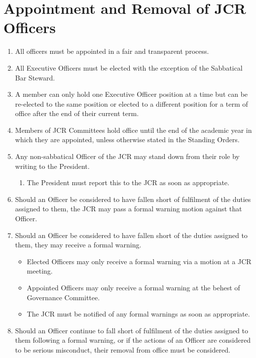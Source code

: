 \documentclass[12pt]{article}
\begin{document}
\section{Appointment and Removal of JCR Officers}
\begin{enumerate}
    \item All officers must be appointed in a fair and transparent process.
    \item All Executive Officers must be elected with the exception of the Sabbatical Bar Steward.
    \item A member can only hold one Executive Officer position at a time but can be re-elected to the same position or elected to a different position for a term of office after the end of their current term.
    \item Members of JCR Committees hold office until the end of the academic year in which they are appointed, unless otherwise stated in the Standing Orders.
    \item Any non-sabbatical Officer of the JCR may stand down from their role by writing to the President.
    \begin{enumerate}
        \item The President must report this to the JCR as soon as appropriate.
    \end{enumerate}
    \item Should an Officer be considered to have fallen short of fulfilment of the duties assigned to them, the JCR may pass a formal warning motion against that Officer.
    \item Should an Officer be considered to have fallen short of the duties assigned to them, they may receive a formal warning.
    \begin{itemize}
        \item Elected Officers may only receive a formal warning via a motion at a JCR meeting.
        \item Appointed Officers may only receive a formal warning at the behest of Governance Committee.
        \item The JCR must be notified of any formal warnings as soon as appropriate.
    \end{itemize}
    \item Should an Officer continue to fall short of fulfilment of the duties assigned to them following a formal warning, or if the actions of an Officer are considered to be serious misconduct, their removal from office must be considered.
    \begin{enumerate}

\end{enumerate}
\end{enumerate}
\end{document}
